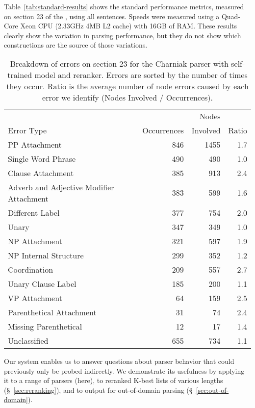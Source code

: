 Table~\ref{tab:standard-results} shows the standard performance metrics,
measured on section 23 of the \wsj, using all sentences.  Speeds were measured
using a Quad-Core Xeon CPU (2.33GHz 4MB L2 cache) with 16GB of RAM.
These results clearly show the variation in parsing performance, but they do
not show which constructions are the source of those variations.

\begin{table}
\begin{center}
\begin{tabular}{|lrrr|}
	\hline
		           &             & Nodes    &       \\
		Error Type & Occurrences & Involved & Ratio \\
	\hline
	\hline
		PP Attachment & 846 & 1455 & 1.7 \\
		Single Word Phrase & 490 & 490 & 1.0 \\
		Clause Attachment & 385 & 913 & 2.4 \\
		Adverb and Adjective Modifier Attachment & 383 & 599 & 1.6 \\
		Different Label & 377 & 754 & 2.0 \\
		Unary & 347 & 349 & 1.0 \\
		NP Attachment & 321 & 597 & 1.9 \\
		NP Internal Structure & 299 & 352 & 1.2 \\
		Coordination & 209 & 557 & 2.7 \\
		Unary Clause Label & 185 & 200 & 1.1 \\
		VP Attachment & 64 & 159 & 2.5 \\
		Parenthetical Attachment & 31 & 74 & 2.4 \\
		Missing Parenthetical & 12 & 17 & 1.4 \\
		Unclassified & 655 & 734 & 1.1 \\
	\hline
\end{tabular}
\caption[Breakdown of errors on section 23 for the Charniak parser with self-trained model and reranker.]{ \label{tab:charniak-breakdown}
	Breakdown of errors on section 23 for the Charniak parser with self-trained model and reranker.
	Errors are sorted by the number of times they occur.
	Ratio is the average number of node errors caused by each error we identify
	(\myie Nodes Involved / Occurrences).
}
\end{center}
\end{table}

Our system enables us to answer questions about parser behavior that could previously only be probed indirectly.
We demonstrate its usefulness by applying it to a range of parsers (here), to reranked K-best lists of various lengths (\S~\ref{sec:reranking}), and to output for out-of-domain parsing (\S~\ref{sec:out-of-domain}).

